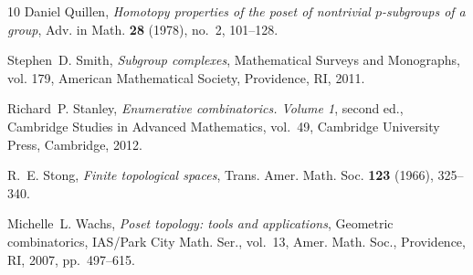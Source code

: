 \documentclass[a4paper,11pt]{article}
\theoremstyle{definition}
\theoremstyle{remark}
\begin{document}
\begin{thebibliography}{10}
Daniel Quillen, \emph{Homotopy properties of the poset of nontrivial
  {$p$}-subgroups of a group}, Adv. in Math. \textbf{28} (1978), no.~2,
  101--128. 

Stephen~D. Smith, \emph{Subgroup complexes}, Mathematical Surveys and
  Monographs, vol. 179, American Mathematical Society, Providence, RI, 2011.
  

Richard~P. Stanley, \emph{Enumerative combinatorics. {V}olume 1}, second ed.,
  Cambridge Studies in Advanced Mathematics, vol.~49, Cambridge University
  Press, Cambridge, 2012. 

R.~E. Stong, \emph{Finite topological spaces}, Trans. Amer. Math. Soc.
  \textbf{123} (1966), 325--340. 

Michelle~L. Wachs, \emph{Poset topology: tools and applications}, Geometric
  combinatorics, IAS/Park City Math. Ser., vol.~13, Amer. Math. Soc.,
  Providence, RI, 2007, pp.~497--615. 

\end{thebibliography}
\end{document}

